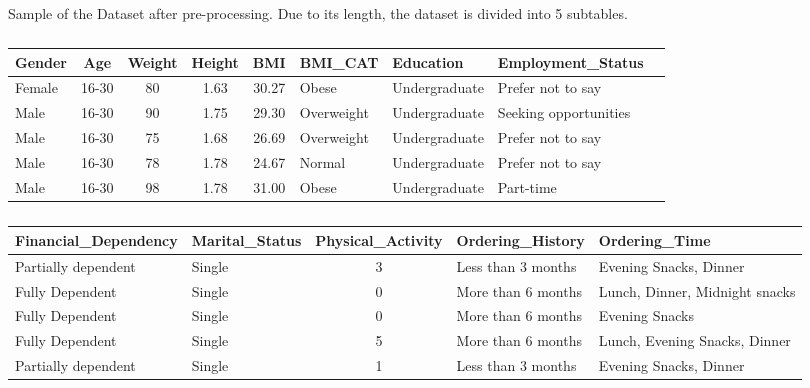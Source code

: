\documentclass[a4paper,fleqn]{cas-sc}
\begin{document}
\begin{table}[htbp]
    \centering
    \caption{Sample of the Dataset after pre-processing. Due to its length, the dataset is divided into 5 subtables.}
    \label{tab:dataset_sample}
    \begin{subtable}{\textwidth}
        \centering
        \begin{tabular*}{\linewidth}{@{\extracolsep{\fill}}lccccllll@{}}
            \toprule
            Gender & Age & Weight & Height & BMI & BMI\_CAT & Education & Employment\_Status \\
            \midrule
            Female & 16-30 & 80 & 1.63 & 30.27 & Obese & Undergraduate & Prefer not to say \\
            Male & 16-30 & 90 & 1.75 & 29.30 & Overweight & Undergraduate & Seeking opportunities \\
            Male & 16-30 & 75 & 1.68 & 26.69 & Overweight & Undergraduate & Prefer not to say \\
            Male & 16-30 & 78 & 1.78 & 24.67 & Normal & Undergraduate & Prefer not to say \\
            Male & 16-30 & 98 & 1.78 & 31.00 & Obese & Undergraduate & Part-time \\
            \bottomrule
        \end{tabular*}
        \caption{}
        \label{tab:sample_1}
    \end{subtable}

    \vspace{1em} %

    \begin{subtable}{\textwidth}
        \centering
        \begin{tabular*}{\linewidth}{@{\extracolsep{\fill}}llcll@{}}
            \toprule
            Financial\_Dependency & Marital\_Status & Physical\_Activity & Ordering\_History & Ordering\_Time \\
            \midrule
            Partially dependent & Single & 3 & Less than 3 months & Evening Snacks, Dinner \\
            Fully Dependent & Single & 0 & More than 6 months & Lunch, Dinner, Midnight snacks \\
            Fully Dependent & Single & 0 & More than 6 months & Evening Snacks \\
            Fully Dependent & Single & 5 & More than 6 months & Lunch, Evening Snacks, Dinner \\
            Partially dependent & Single & 1 & Less than 3 months & Evening Snacks, Dinner \\
            \bottomrule
        \end{tabular*}
        \caption{}
        \label{tab:sample_2}
    \end{subtable}


\end{table}
\end{document}
